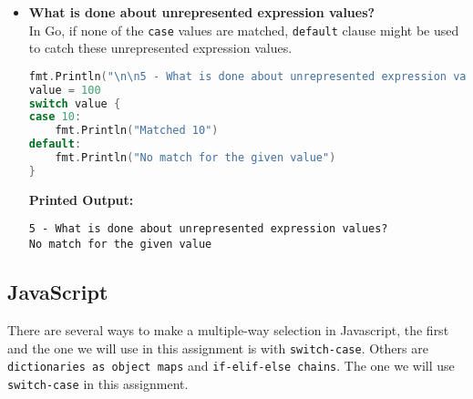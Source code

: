 \documentclass{article}
\begin{document}
\begin{itemize}
\begin{lstlisting}[language=Go]
// expression with variables
var m, n int = 2, 3
switch value {
case m * n:
    fmt.Println("Matched 6")
case m + n:
    fmt.Println("Matched 5")
}

// multiple case values

switch value {
case 1, 2, 3:
    fmt.Println("Matched 1, 2, or 3")
case 4, 5, 6:
    fmt.Println("Matched 4, 5, or 6")
}

// variables
var a, b int = 1, 3
switch value {
case a:
    fmt.Println("Matched a")
case b:
    fmt.Println("Matched b")
}

// different types not allowed: 
// "Compile time error: cannot convert "2" (untyped string constant) to type int"
/*switch value {
case 1:
    fmt.Println("Matched 1")
case "2":
    fmt.Println("Matched string 2")
}*/

// type switch
var i2 interface{} = 4
switch i2.(type) {
case int:
    fmt.Println("Matched int")
case string:
    fmt.Println("Matched string")
case bool:
    fmt.Println("Matched bool")
case nil:
    fmt.Println("Matched nil")
}
\end{lstlisting}
\textbf{Printed Output:} \begin{verbatim}
4 - How are case values specified?
Matched 3
Matched 3
Matched 1, 2, or 3
Matched b
Matched int
\end{verbatim}

\item \textbf{What is done about unrepresented expression values?} \\
In Go, if none of the \texttt{case} values are matched, \texttt{default} clause might be used to catch these unrepresented expression values.
\begin{lstlisting}[language=Go]
fmt.Println("\n\n5 - What is done about unrepresented expression values?")
value = 100
switch value {
case 10:
    fmt.Println("Matched 10")
default:
    fmt.Println("No match for the given value")
}
\end{lstlisting}
\textbf{Printed Output:} \begin{verbatim}
5 - What is done about unrepresented expression values?
No match for the given value
\end{verbatim}
\end{itemize}
\newpage




\subsection{JavaScript}
There are several ways to make a multiple-way selection in Javascript, the first and the one we will use in this assignment is with \texttt{switch-case}. Others are \texttt{dictionaries as object maps} and \texttt{if-elif-else chains}. The one we will use \texttt{switch-case} in this assignment.
\end{document}
